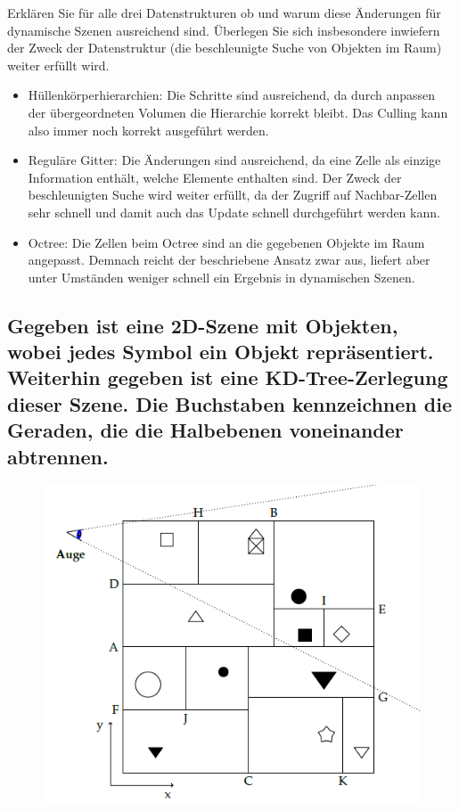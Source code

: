 \documentclass[a4paper,10pt,DIV=14]{article}
\begin{document}
Erklären Sie für alle drei Datenstrukturen ob und warum diese Änderungen für dynamische Szenen ausreichend sind. Überlegen Sie sich insbesondere inwiefern der Zweck der Datenstruktur (die beschleunigte Suche von Objekten im Raum) weiter erfüllt wird.

\begin{itemize}
\item Hüllenkörperhierarchien: Die Schritte sind ausreichend, da durch anpassen der übergeordneten Volumen die Hierarchie korrekt bleibt. Das Culling kann also immer noch korrekt ausgeführt werden.
\item Reguläre Gitter:  Die Änderungen sind ausreichend, da eine Zelle als einzige Information enthält, welche Elemente enthalten sind. Der Zweck der beschleunigten Suche wird weiter erfüllt, da der Zugriff auf Nachbar-Zellen sehr schnell und damit auch das Update schnell durchgeführt werden kann.
\item Octree: Die Zellen beim Octree sind an die gegebenen Objekte im Raum angepasst. Demnach reicht der beschriebene Ansatz zwar aus, liefert aber unter Umständen weniger schnell ein Ergebnis in dynamischen Szenen.
\end{itemize}

\subsection{Gegeben ist eine 2D-Szene mit Objekten, wobei jedes Symbol ein Objekt repräsentiert. Weiterhin gegeben ist eine KD-Tree-Zerlegung dieser Szene. Die Buchstaben kennzeichnen die Geraden, die die Halbebenen voneinander abtrennen.}

\begin{figure}[!htbp]
	\centering
	\includegraphics[]{scene}
\end{figure}
\end{document}

